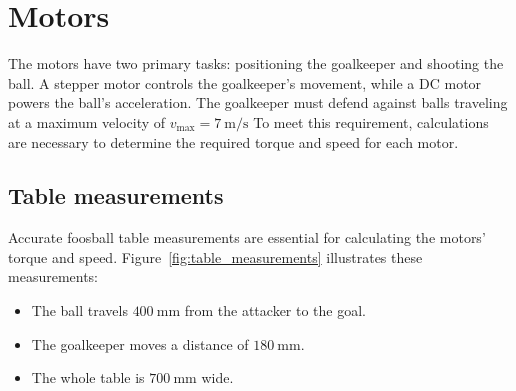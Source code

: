 \newpage
\section{Motors}\label{sec:motors}
The motors have two primary tasks: positioning the goalkeeper and shooting the ball.
A stepper motor controls the goalkeeper's movement, while a DC motor powers the ball's acceleration.
The goalkeeper must defend against balls traveling at a maximum velocity of $v_{\text{max}} = \qty[per-mode=symbol]{7}{\m\per\s}$
To meet this requirement, calculations are necessary to determine the required torque and speed for each motor.

\subsection{Table measurements}\label{subsec:table_measurements}
Accurate foosball table measurements are essential for calculating the motors' torque and speed.
Figure~\ref{fig:table_measurements} illustrates these measurements:
\begin{itemize}
    \item The ball travels $\qty[per-mode=symbol]{400}{\mm}$ from the attacker to the goal.
    \item The goalkeeper moves a distance of $\qty[per-mode=symbol]{180}{\mm}$.
    \item The whole table is $\qty[per-mode=symbol]{700}{\mm}$ wide.
\end{itemize}

